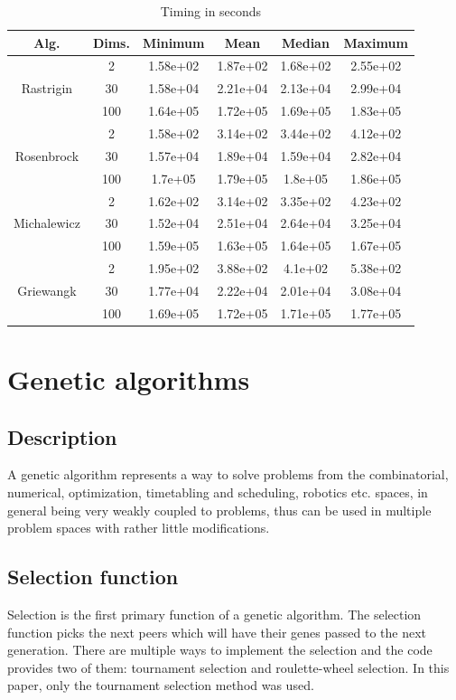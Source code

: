 \documentclass[conference]{IEEEtran}
\begin{document}
\begin{table}[!htbp]
    \caption{Timing in seconds}
    \centering
    \begin{tabular}{|c c|c c c c|}
        \hline
        Alg. & Dims. & Minimum & Mean & Median & Maximum \\
        \hline
        \multirow{3}{*}{Rastrigin} & 2 & 1.58e+02 & 1.87e+02 & 1.68e+02 & 2.55e+02 \\
        & 30 & 1.58e+04 & 2.21e+04 & 2.13e+04 & 2.99e+04 \\
        & 100 & 1.64e+05 & 1.72e+05 & 1.69e+05 & 1.83e+05 \\
        \hline
        \multirow{3}{*}{Rosenbrock} & 2 & 1.58e+02 & 3.14e+02 & 3.44e+02 & 4.12e+02 \\
        & 30 & 1.57e+04 & 1.89e+04 & 1.59e+04 & 2.82e+04 \\
        & 100 & 1.7e+05 & 1.79e+05 & 1.8e+05 & 1.86e+05 \\
        \hline
        \multirow{3}{*}{Michalewicz} & 2 & 1.62e+02 & 3.14e+02 & 3.35e+02 & 4.23e+02 \\
        & 30 & 1.52e+04 & 2.51e+04 & 2.64e+04 & 3.25e+04 \\
        & 100 & 1.59e+05 & 1.63e+05 & 1.64e+05 & 1.67e+05 \\
        \hline
        \multirow{3}{*}{Griewangk} & 2 & 1.95e+02 & 3.88e+02 & 4.1e+02 & 5.38e+02 \\
        & 30 & 1.77e+04 & 2.22e+04 & 2.01e+04 & 3.08e+04 \\
        & 100 & 1.69e+05 & 1.72e+05 & 1.71e+05 & 1.77e+05 \\
        \hline
    \end{tabular}
\end{table}


\section{Genetic algorithms}

\subsection{Description}
A genetic algorithm represents a way to solve problems from the combinatorial, numerical, optimization, timetabling and
scheduling, robotics etc. spaces, in general being very weakly coupled to problems, thus can be used in multiple problem
spaces with rather little modifications.

\subsection{Selection function}
Selection is the first primary function of a genetic algorithm. The selection function picks the next peers which will have
their genes passed to the next generation. There are multiple ways to implement the selection and the code provides two of them:
tournament selection and roulette-wheel selection. In this paper, only the tournament selection method was used.
\end{document}

